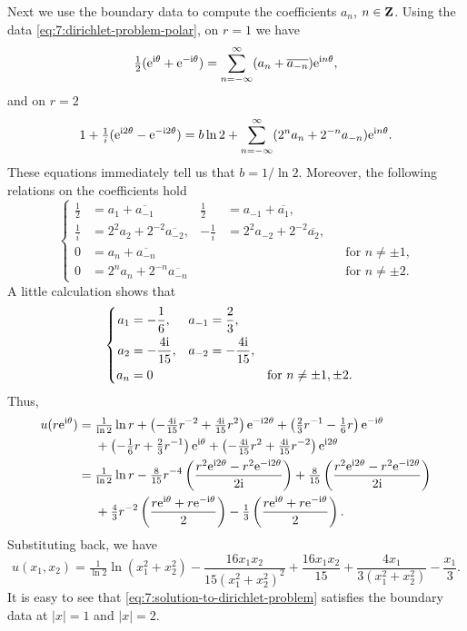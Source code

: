 \begin{solution*}
  Next we use the boundary data to compute the coefficients \(a_n\),
  \(n\in\mathbf{Z}\). Using the data \eqref{eq:7:dirichlet-problem-polar}, on
  \(r=1\) we have
  \[
    \tfrac{1}{2}(\rme^{\rmi\theta}+\rme^{-\rmi\theta})%
    =\sum_{n=-\infty}^\infty (a_n+\overline{a_{-n}})\rme^{\rmi n\theta},
  \]
  and on \(r=2\)
  \[
    1+\tfrac{1}{i}(\mathrm{e}^{\mathrm{i} 2\theta}-\mathrm{e}^{-\mathrm{i} 2\theta}) = b\ln
    2+\sum_{n=-\infty}^\infty (2^na_n+2^{-n}a_{-n})\mathrm{e}^{\mathrm{i} n\theta}.
  \]
  These equations immediately tell us that \(b=1/{\ln 2}\). Moreover, the
  following relations on the coefficients hold
  \[
    \left\{
    \begin{aligned}
      \frac{1}{2}&=a_1+\overline{a_{-1}}
      &\frac{1}{2}&=a_{-1}+\overline{a_1},\\
      \frac{1}{i}&=2^2a_2+2^{-2}\overline{a_{-2}},
      &-\frac{1}{i}&=2^2a_{-2}+2^{-2}\overline{a_{2}},\\
      0&=a_n+\overline{a_{-n}}&&&&\text{for \(n\neq\pm 1\),}\\
      0&=2^{n}a_n+2^{-n}\overline{a_{-n}}&&&&\text{for \(n\neq\pm 2\).}
    \end{aligned}
    \right.
  \]
  A little calculation shows that
  \[
    \left\{
      \begin{aligned}
        a_1&=-\frac{1}{6},&a_{-1}&=\frac{2}{3},\\
        a_2&=-\frac{4\mathrm{i}}{15},&a_{-2}&=-\frac{4\mathrm{i}}{15},\\
        a_n&=0&&&&\text{for \(n\neq \pm 1,\pm 2\).}
      \end{aligned}
    \right.
  \]
  Thus,
  \[
    \begin{aligned}
      u(r\rme^{\rmi\theta})
      &=\tfrac{1}{\ln 2}\ln r
      +\left(-\tfrac{4\rmi}{15}r^{-2}+\tfrac{4\rmi}{15}r^2\right)\rme^{-\rmi
        2\theta} +\left(\tfrac{2}{3}r^{-1}-\tfrac{1}{6}r\right)\rme^{-\rmi\theta}\\
      &\phantom{{}={}}
      +\left(-\tfrac{1}{6}r+\tfrac{2}{3}r^{-1}\right)\rme^{\rmi\theta}
      +\left(-\tfrac{4\rmi}{15}r^2+\tfrac{4\rmi}{15}r^{-2}\right)\rme^{\rmi
        2\theta}\\
      &=\tfrac{1}{\ln 2}\ln r-\tfrac{8}{15}r^{-4}
      \left(\frac{r^2\rme^{\rmi 2\theta}-r^2\rme^{-\rmi 2\theta}}{2\rmi}\right)
      +\tfrac{8}{15}
      \left(\frac{r^2\rme^{\rmi 2\theta}-r^2\rme^{-\rmi
            2\theta}}{2\rmi}\right)\\
      &\phantom{{}={}}
      +\tfrac{4}{3}r^{-2}
      \left(\frac{r\rme^{\rmi\theta}+r\rme^{-\rmi\theta}}{2}\right)
      -\tfrac{1}{3}
      \left(\frac{r\rme^{\rmi\theta}+r\rme^{-\rmi\theta}}{2}\right).
    \end{aligned}
  \]
  Substituting back, we have
  \begin{equation}
    \label{eq:7:solution-to-dirichlet-problem}
    u(x_1,x_2)=\tfrac{1}{\ln 2}\ln(x_1^2+x_2^2)
    -\frac{16x_1x_2}{15{(x_1^2+x_2^2)}^2}+\frac{16x_1x_2}{15}
    +\frac{4x_1}{3(x_1^2+x_2^2)}-\frac{x_1}{3}.
  \end{equation}
  It is easy to see that \eqref{eq:7:solution-to-dirichlet-problem}
  satisfies the boundary data at \(|x|=1\) and \(|x|=2\).
\end{solution*}

